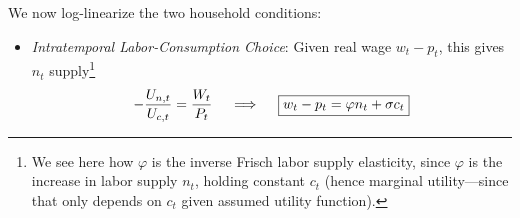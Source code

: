 \documentclass[12pt]{article}
\theoremstyle{plain}
\theoremstyle{definition}
\theoremstyle{remark}
\begin{document}
We now log-linearize the two household conditions:
\begin{itemize}

  \item \emph{Intratemporal Labor-Consumption Choice}:
    Given real wage $w_t-p_t$, this gives $n_t$ supply\footnote{%
      We see here how $\varphi$ is the inverse Frisch labor supply
      elasticity, since $\varphi$ is the increase in labor supply $n_t$,
      holding constant $c_t$ (hence marginal utility---since that only
      depends on $c_t$ given assumed utility function).
    }
    \begin{align*}
      -\frac{U_{n,t}}{U_{c,t}}
      =
      \frac{W_t}{P_{t}}
      \quad\implies\quad
      \boxed{%
      w_t - p_t
      =
      \varphi n_t
      + \sigma c_t
      }
    \end{align*}


\end{itemize}
\end{document}
